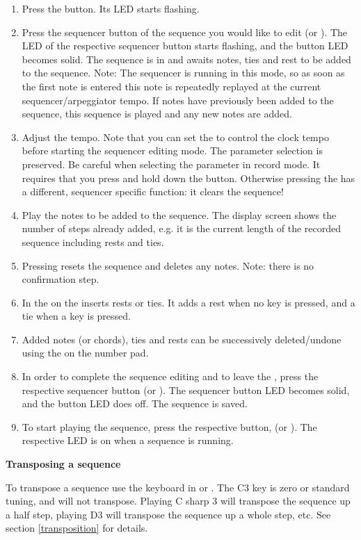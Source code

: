 \begin{enumerate}
  \item Press the \record button. Its LED starts flashing.
  \item Press the sequencer button of the sequence you would like to edit (\seqone or \seqtwo). The LED of the respective sequencer button starts flashing, and the \record button LED becomes solid. The sequence is in \seqedit and awaits notes, ties and rest to be added to the sequence. Note: The sequencer is running in this mode, so as soon as the first note is entered this note is repeatedly replayed at the current sequencer/arpeggiator tempo. If notes have previously been added to the sequence, this sequence is played and any new notes are added. 
  \item Adjust the tempo. Note that you can set the \datadial to control the clock tempo before starting the sequencer editing mode. The parameter selection is preserved. Be careful when selecting the parameter in record mode. It requires that you press and hold down the \totape button. Otherwise pressing the  has a different, sequencer specific function: it clears the sequence!  
  \item Play the notes to be added to the sequence. The display screen shows the number of steps already added, e.g. it is the current length of the recorded sequence including rests and ties.
  \item Pressing  resets the sequence and deletes any notes. Note: there is no confirmation step. 
  \item In \seqedit the  on the \termnumberpad inserts rests or ties. It adds a rest when no key is pressed, and a tie when a key is pressed.
  \item Added notes (or chords), ties and rests can be successively deleted/undone using the  on the number pad. 
  \item In order to complete the sequence editing and to leave the \seqedit, press the respective sequencer button (\seqone or \seqtwo). The sequencer button LED becomes solid, and the \record button LED does off. The sequence is saved. 
  \item To start playing the sequence, press the respective button, (\seqone or \seqtwo). The respective LED is on when a sequence is running.
\end{enumerate}

\textbf{Transposing a  sequence}

To transpose a sequence use the keyboard in \shiftmode or \shiftlock. The C3 key is zero or standard tuning, and will not transpose. Playing C sharp 3 will transpose the sequence up a half step, playing D3 will transpose the sequence up a whole step, etc. See section \ref{transposition} for details.
